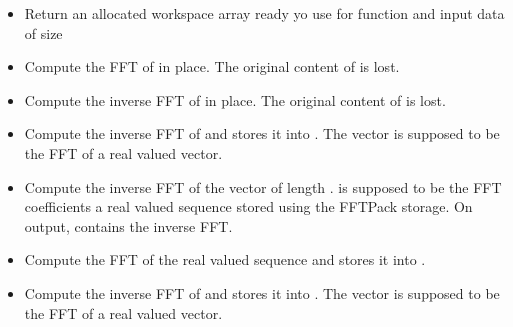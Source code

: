 \begin{itemize}
  \item {}
    \sshortdescribe Return an allocated workspace array ready yo use for function  and input data of size 

  \item {}
    \sshortdescribe Compute the FFT of  in place. The original content of  is lost.

  \item {}
    \sshortdescribe Compute the inverse FFT of  in place. The original content of  is lost.

  \item {}
    \sshortdescribe Compute the inverse FFT of  and stores it into . The vector  is supposed to be the FFT of a real valued vector.

  \item {}
  \sshortdescribe Compute the inverse FFT of the vector  of length
  .  is supposed to be the FFT coefficients a real valued
  sequence stored using the FFTPack storage. On output,  contains
  the inverse FFT.

  \item {}
    \sshortdescribe Compute the FFT of the real valued sequence  and stores it into .

  \item {}
    \sshortdescribe Compute the inverse FFT of  and stores it into . The vector  is supposed to be the FFT of a real valued vector.
\end{itemize}



